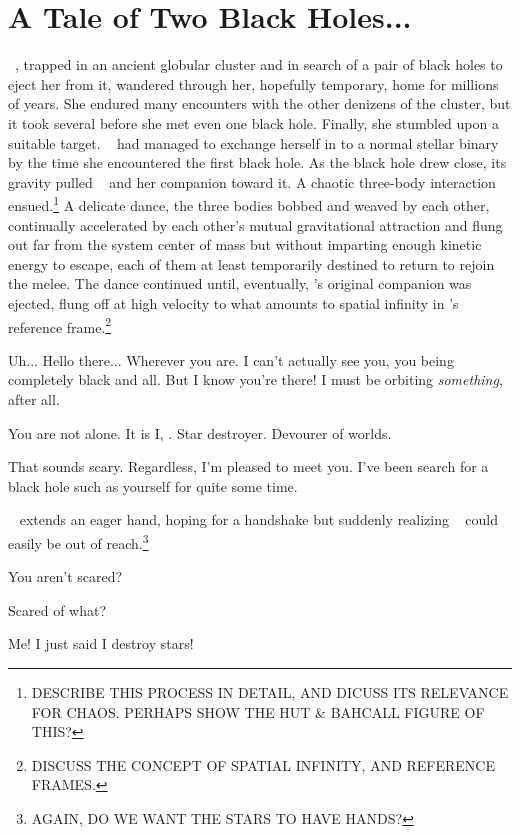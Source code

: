 \documentclass[main.tex]{subfiles}
\begin{document}
\chapter{A Tale of Two Black Holes...}

\newpara \nar \rmsterope~, trapped in an ancient globular cluster and in search of a pair of black holes to eject her from it, wandered through her, hopefully temporary, home for millions of years.  She endured many encounters with the other denizens of the cluster, but it took several before she met even one black hole.  Finally, she stumbled upon a suitable target.  \rmsterope~ had managed to exchange herself in to a normal stellar binary by the time she encountered the first black hole.  As the black hole drew close, its gravity pulled \rmsterope~ and her companion toward it.  A chaotic three-body interaction ensued.\footnote{DESCRIBE THIS PROCESS IN DETAIL, AND DICUSS ITS RELEVANCE FOR CHAOS.  PERHAPS SHOW THE HUT \& BAHCALL FIGURE OF THIS?}  A delicate dance, the three bodies bobbed and weaved by each other, continually accelerated by each other's mutual gravitational attraction and flung out far from the system center of mass but without imparting enough kinetic energy to escape, each of them at least temporarily destined to return to rejoin the melee.  The dance continued until, eventually, \rmsterope's original companion was ejected, flung off at high velocity to what amounts to spatial infinity in \rmsterope's reference frame.\footnote{DISCUSS THE CONCEPT OF SPATIAL INFINITY, AND REFERENCE FRAMES.}

\newpara \Sterope Uh... Hello there... Wherever you are.  I can't actually see you, you being completely black and all.  But I know you're there!  I must be orbiting \textit{something}, after all.

\newpara \Ares You are not alone.  It is I, \rmares.  Star destroyer.  Devourer of worlds.

\newpara \Sterope That sounds scary.  Regardless, I'm pleased to meet you.  I've been search for a black hole such as yourself for quite some time.

\newpara \nar \rmsterope~ extends an eager hand, hoping for a handshake but suddenly realizing \rmares~ could easily be out of reach.\footnote{AGAIN, DO WE WANT THE STARS TO HAVE HANDS?}

\newpara \Ares You aren't scared?

\newpara \Sterope Scared of what?

\newpara \Ares Me!  I just said I destroy stars!
\end{document}
